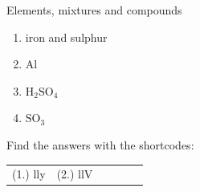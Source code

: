 \begin{exercises}{Elements, mixtures and compounds}
{\begin{enumerate}[noitemsep, label=\textbf{\arabic*}. ]
\begin{enumerate}[noitemsep, label=\textbf{\alph*}. ]
\label{m38708*uid31}\item iron and sulphur
\label{m38708*uid32}\item $\mathrm{Al}$
\label{m38708*uid33}\item $\mathrm{H}{}_{2}\mathrm{SO}{}_{4}$\label{m38708*uid34}\item $\mathrm{SO}{}_{3}$\end{enumerate}
                \end{enumerate}
    \label{m38708*cid4}
\par {} Find the answers with the shortcodes:
 \par \begin{tabular}[h]{cccccc}
 (1.) lly  &  (2.) llV  & \end{tabular}}
\end{exercises}
